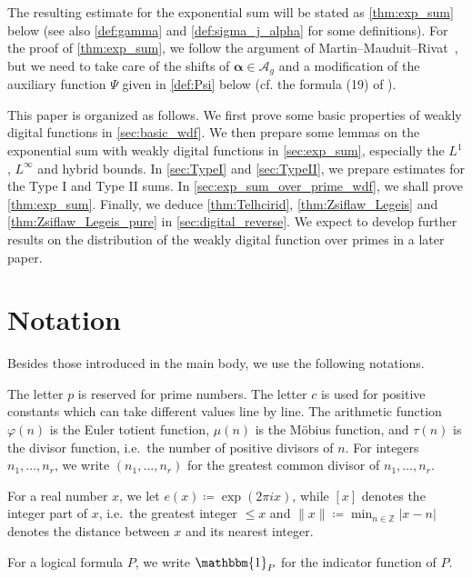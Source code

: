 \documentclass[hidelinks]{amsart}
\numberwithin{equation}{section}
\theoremstyle{plain}
\theoremstyle{definition}
\let\tmp\phi
\let\phi\varphi
\let\varphi\tmp
\let\tmp\epsilon
\let\epsilon\varepsilon
\let\varepsilon\tmp
\begin{document}
The resulting estimate for the exponential sum will be stated as \cref{thm:exp_sum} below
(see also \cref{def:gamma} and \cref{def:sigma_j_alpha} for some definitions).
For the proof of \cref{thm:exp_sum},
we follow the argument of Martin--Mauduit--Rivat~\cite{MartinMauduitRivat:Digital},
but we need to take care of the shifts of $\bm{\alpha}\in\mathscr{A}_{g}$
and a modification of the auxiliary function $\Psi$ given in \cref{def:Psi} below
(cf. the formula (19) of \cite{MartinMauduitRivat:Digital}).

This paper is organized as follows.
We first prove some basic properties of weakly digital functions
in \cref{sec:basic_wdf}.
We then prepare some lemmas on the exponential sum with weakly digital functions
in \cref{sec:exp_sum}, especially the $L^{1}$, $L^{\infty}$ and hybrid bounds.
In \cref{sec:TypeI} and \cref{sec:TypeII},
we prepare estimates for the Type I and Type II sums.
In \cref{sec:exp_sum_over_prime_wdf}, we shall prove \cref{thm:exp_sum}.
Finally, we deduce \cref{thm:Telhcirid}, \cref{thm:Zsiflaw_Legeis} and \cref{thm:Zsiflaw_Legeis_pure}
in \cref{sec:digital_reverse}.
We expect to develop further results on the distribution of the weakly digital function over primes in a later paper.

\section{Notation}
\label{sec:notation}
Besides those introduced in the main body,
we use the following notations.

The letter $p$ is reserved for prime numbers.
The letter $c$ is used for positive constants
which can take different values line by line.
The arithmetic function $\phi(n)$ is the Euler totient function,
$\mu(n)$ is the M\"{o}bius function,
and $\tau(n)$ is the divisor function, i.e.\ the number of positive divisors of $n$.
For integers $n_{1},\ldots,n_{r}$,
we write $(n_{1},\ldots,n_{r})$ for the greatest common divisor of $n_{1},\ldots,n_{r}$.

For a real number $x$, we let $e(x)\coloneqq\exp(2\pi ix)$, while
$[x]$ denotes the integer part of $x$, i.e.\ the greatest integer $\le x$
and $\|x\|\coloneqq\min_{n\in\mathbb{Z}}|x-n|$ denotes the distance between $x$ and its nearest integer.

For a logical formula $P$,
we write $\mathbbm{1}_{P}$
for the indicator function of $P$.
\end{document}
